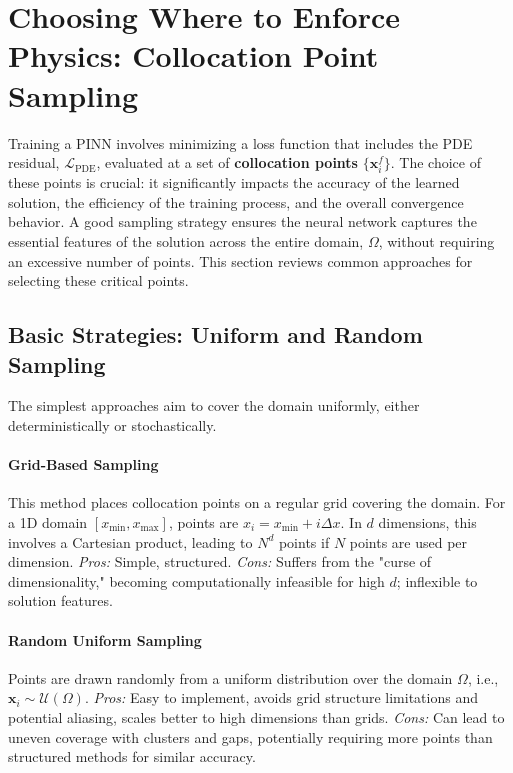 \section{Choosing Where to Enforce Physics: Collocation Point Sampling}
\label{sec:collocation-sampling}

Training a PINN involves minimizing a loss function that includes the PDE residual, $\mathcal{L}_{\text{PDE}}$, evaluated at a set of \textbf{collocation points} $\{\mathbf{x}_i^f\}$. The choice of these points is crucial: it significantly impacts the accuracy of the learned solution, the efficiency of the training process, and the overall convergence behavior. A good sampling strategy ensures the neural network captures the essential features of the solution across the entire domain, $\Omega$, without requiring an excessive number of points. This section reviews common approaches for selecting these critical points.

\subsection{Basic Strategies: Uniform and Random Sampling}

The simplest approaches aim to cover the domain uniformly, either deterministically or stochastically.

\paragraph{Grid-Based Sampling} This method places collocation points on a regular grid covering the domain. For a 1D domain $[x_{\min}, x_{\max}]$, points are $x_i = x_{\min} + i\Delta x$. In $d$ dimensions, this involves a Cartesian product, leading to $N^d$ points if $N$ points are used per dimension.
\textit{Pros:} Simple, structured. \textit{Cons:} Suffers from the "curse of dimensionality," becoming computationally infeasible for high $d$; inflexible to solution features.

\paragraph{Random Uniform Sampling} Points are drawn randomly from a uniform distribution over the domain $\Omega$, i.e., $\mathbf{x}_i \sim \mathcal{U}(\Omega)$.
\textit{Pros:} Easy to implement, avoids grid structure limitations and potential aliasing, scales better to high dimensions than grids. \textit{Cons:} Can lead to uneven coverage with clusters and gaps, potentially requiring more points than structured methods for similar accuracy.

